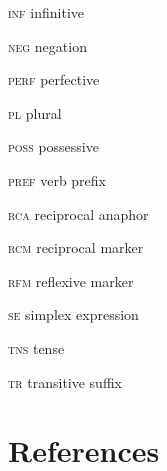 \documentclass[output=paper]{langsci/langscibook}
\begin{document}
\textsc{inf}    infinitive

\textsc{neg}    negation

\textsc{perf}    perfective

\textsc{pl}    plural

\textsc{poss}    possessive

\textsc{pref}    verb prefix

\textsc{rca}    reciprocal anaphor

\textsc{rcm}    reciprocal marker

\textsc{rfm}    reflexive marker

\textsc{se}    simplex expression  

\textsc{tns}    tense

\textsc{tr}    transitive suffix

\section{References}
\end{document}
